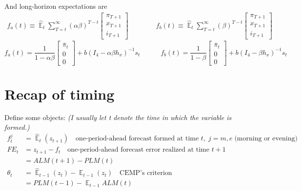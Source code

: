 \documentclass[11pt]{article}
\renewcommand{\[}{\begin{equation}}
\renewcommand{\]}{\end{equation}}
\DeclareMathOperator{\E}{\mathbb{E}}
\begin{document}
And long-horizon expectations are
\begin{align}
f_a(t)  \equiv  \hat{\E}_t\sum_{T=t}^{\infty} (\alpha\beta)^{T-t } \begin{bmatrix} \pi_{T+1} \\ x_{T+1} \\ i_{T+1} \end{bmatrix} \quad \quad \quad \quad f_b(t)  \equiv \hat{\E}_t\sum_{T=t}^{\infty} (\beta)^{T-t } \begin{bmatrix} \pi_{T+1} \\ x_{T+1} \\ i_{T+1} \end{bmatrix}\label{fafb}
\end{align}
\begin{equation}
f_a(t) = \frac{1}{1-\alpha\beta}\begin{bmatrix} \bar{\pi}_t \\ 0 \\ 0 \end{bmatrix} + b(I_4 - \alpha\beta h_x)^{-1}s_t \quad \quad \quad f_b(t) = \frac{1}{1-\beta}\begin{bmatrix} \bar{\pi}_t \\ 0 \\ 0 \end{bmatrix}  + b(I_4 - \beta h_x)^{-1}s_t  \label{fafb_analytical}
\end{equation}

\clearpage
\section{Recap of timing}

Define some objects: \emph{(I usually let t denote the time in which the variable is formed.)}
\begin{align}
f^j_t &= \hat{\E}_t(z_{t+1}) \quad \text{one-period-ahead forecast formed at time } t, \; j=m,e \; \text{(morning or evening)} \\
FE_t & = z_{t+1}-f_t \quad \text{one-period-ahead forecast error realized at time } t+1 \\
& = ALM(t+1) - PLM(t) \\
\theta_t &=  \hat{\E}_{t-1}(z_{t}) - \E_{t-1}(z_{t}) \quad \text{CEMP's criterion} \\
& = PLM(t-1) - \E_{t-1}ALM(t)
\end{align}
\end{document}
